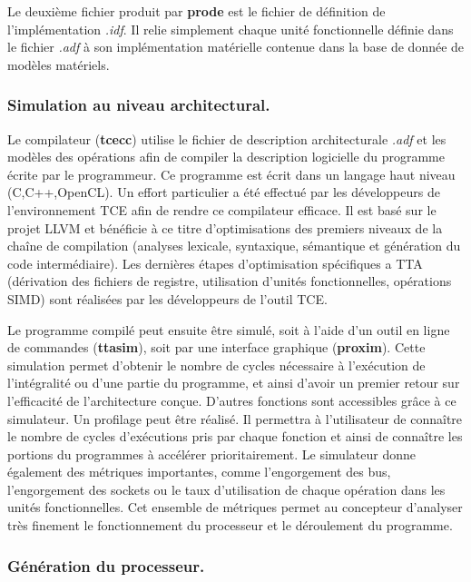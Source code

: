 Le deuxième fichier produit par \textbf{prode} est le fichier de définition de l'implémentation \textit{.idf}. Il relie simplement chaque unité fonctionnelle définie dans le fichier \textit{.adf} à son implémentation matérielle contenue dans la base de donnée de modèles matériels.

\subsubsection{Simulation au niveau architectural.}

Le compilateur (\textbf{tcecc}) utilise le fichier de description architecturale \textit{.adf} et les modèles des opérations afin de compiler la description logicielle du programme écrite par le programmeur. Ce programme est écrit dans un langage haut niveau (C,C++,OpenCL). Un effort particulier a été effectué par les développeurs de l'environnement TCE afin de rendre ce compilateur efficace. Il est basé sur le projet LLVM \cite{lattner_llvm:_2004} et bénéficie à ce titre d'optimisations des premiers niveaux de la chaîne de compilation (analyses lexicale, syntaxique, sémantique et génération du code intermédiaire). Les dernières étapes d'optimisation spécifiques a TTA (dérivation des fichiers de registre, utilisation d'unités fonctionnelles, opérations SIMD) sont réalisées par les développeurs de l'outil TCE.

Le programme compilé peut ensuite être simulé, soit à l'aide d'un outil en ligne de commandes (\textbf{ttasim}), soit par une interface graphique (\textbf{proxim}). Cette simulation permet d'obtenir le nombre de cycles nécessaire à l'exécution de l'intégralité ou d'une partie du programme, et ainsi d'avoir un premier retour sur l'efficacité de l'architecture conçue. D'autres fonctions sont accessibles grâce à ce simulateur. Un profilage peut être réalisé. Il permettra à l'utilisateur de connaître le nombre de cycles d'exécutions pris par chaque fonction et ainsi de connaître les portions du programmes à accélérer prioritairement. Le simulateur donne également des métriques importantes, comme l'engorgement des bus, l'engorgement des sockets ou le taux d'utilisation de chaque opération dans les unités fonctionnelles. Cet ensemble de métriques permet au concepteur d'analyser très finement le fonctionnement du processeur et le déroulement du programme.

\subsubsection{Génération du processeur.}

